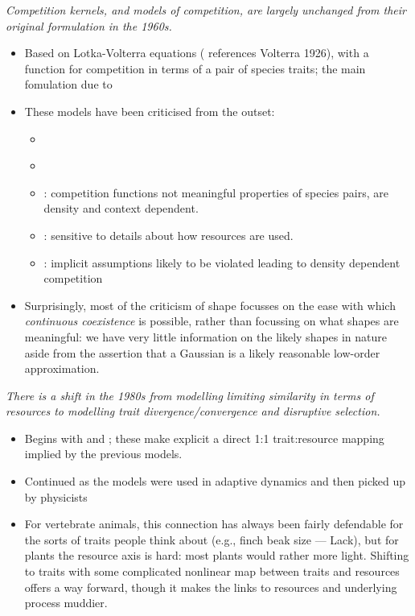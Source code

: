 \documentclass[a4paper,11pt]{article}
\begin{document}
\textit{Competition kernels, and models of competition, are largely
  unchanged from their original formulation in the 1960s.}
\begin{itemize}
\item Based on Lotka-Volterra equations (\citealt{MacArthur-1967}
  references Volterra 1926), with a function for competition in terms
  of a pair of species traits; the main fomulation due to
  \citet{MacArthur-1967}
\item These models have been criticised from the outset:
\begin{itemize}
\item \citet{Andrewartha-1953}
\item \citet{May-1972}
\item \citet{Neill-1974}: competition functions not meaningful
  properties of species pairs, are density and context dependent.
\item \citet{Abrams-1975}: sensitive to details about how resources
  are used.
\item \citet{Abrams-1980}: implicit assumptions likely to be violated
  leading to density dependent competition
\end{itemize}
\item Surprisingly, most of the criticism of shape focusses on the
  ease with which \emph{continuous coexistence} is possible, rather
  than focussing on what shapes are meaningful: we have very little
  information on the likely shapes in nature aside from the assertion
  that a Gaussian is a likely reasonable low-order approximation.
\end{itemize}

\textit{There is a shift in the 1980s from modelling limiting
  similarity in terms of resources to modelling trait
  divergence/convergence and disruptive selection.}
\begin{itemize}
\item Begins with \citet{Taper-1985} and \citet{Brown-1987-140}; these
  make explicit a direct 1:1 trait:resource mapping implied by the
  previous models.
\item Continued as the models were used in adaptive dynamics
  \citep[e.g.,][]{Dieckmann-1999} and then picked up by physicists
  \citep[e.g.,][]{Leimar-2013}
\item For vertebrate animals, this connection has always been fairly
  defendable for the sorts of traits people think about (e.g., finch
  beak size --- Lack), but for plants the resource axis is hard: most
  plants would rather more light.  Shifting to traits with some
  complicated nonlinear map between traits and resources offers a way
  forward, though it makes the links to resources and underlying
  process muddier.
\end{itemize}
\end{document}
